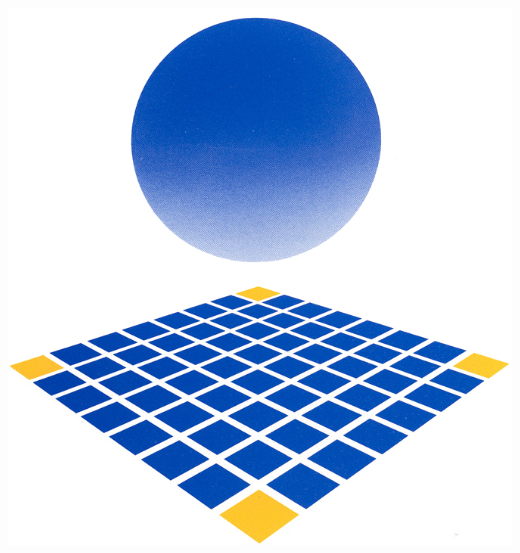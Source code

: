 %
%
%
% 
%


\begin{titlepage}

\newcommand{\HRule}{\rule{\linewidth}{0.5mm}}

\center %


\includegraphics[scale=0.70]{./img/logo}\\[1cm]


\end{titlepage}
